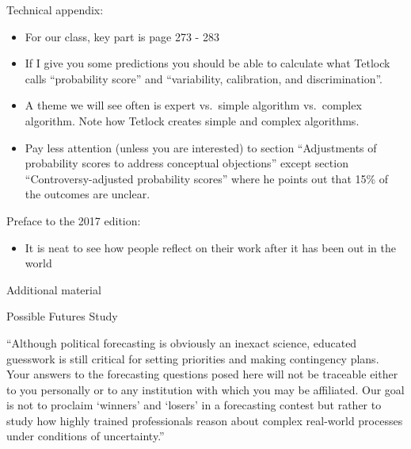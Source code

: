 \documentclass[aspectratio=169]{beamer}
\begin{document}
\begin{frame}

Technical appendix:
\begin{itemize}
\item For our class, key part is page 273 - 283
\pause
\item If I give you some predictions you should be able to calculate what Tetlock calls ``probability score'' and ``variability, calibration, and discrimination''.
\pause
\item A theme we will see often is expert vs.\ simple algorithm vs.\ complex algorithm.  Note how Tetlock creates simple and complex algorithms.
\pause
\item Pay less attention (unless you are interested) to section ``Adjustments of probability scores to address conceptual objections'' except section ``Controversy-adjusted probability scores'' where he points out that 15\% of the outcomes are unclear.
\end{itemize}

\end{frame}
\begin{frame}

Preface to the 2017 edition:
\begin{itemize}
\item It is neat to see how people reflect on their work after it has been out in the world
\end{itemize}

\end{frame}
\begin{frame}

\begin{center}
\LARGE{Additional material}
\end{center}

\end{frame}
\begin{frame}

Possible Futures Study

\end{frame}
\begin{frame}

``Although political forecasting is obviously an inexact science, educated guesswork is still critical for setting priorities and making contingency plans. Your answers to the forecasting questions posed here will not be traceable either to you personally or to any institution with which you may be affiliated. Our goal is not to proclaim ‘winners’ and ‘losers’ in a forecasting contest but rather to study how highly trained professionals reason about complex real-world processes under conditions of uncertainty.''

\end{frame}
\end{document}
